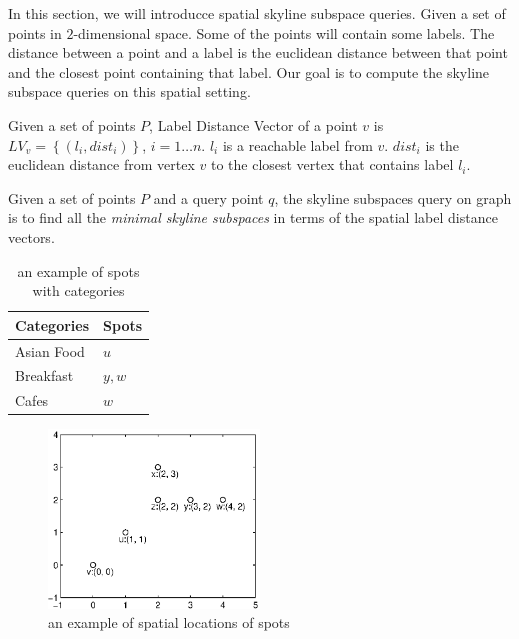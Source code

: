 In this section, we will introducce spatial skyline subspace queries. Given a set of points in $2$-dimensional space. Some of the points will contain some labels. The distance between a point and a label is the euclidean distance between that point and the closest point containing that label. Our goal is to compute the skyline subspace queries on this spatial setting.

\begin{definition}
Given a set of points $P$, Label Distance Vector of a point $v$ is $LV_v=\left\{\left(l_i, dist_i\right)\right\}$, $i = 1 \ldots n$. $l_i$ is a reachable label from $v$. $dist_i$ is the euclidean distance from vertex $v$ to the closest vertex that contains label $l_i$.
\end{definition}

\begin{definition}
Given a set of points $P$ and a query point $q$, the skyline subspaces query on graph is to find all the \emph{minimal skyline subspaces} in terms of the spatial label distance vectors.
\end{definition}

\begin{table}[h]
    \centering
    \begin{tabular}{|l|l|}
    \hline
    Categories     & Spots \\ \hline
    Asian Food     & $u$     \\ \hline
    Breakfast      & $y, w$  \\ \hline
    Cafes          & $w$     \\ \hline
    \end{tabular}
    \caption{\label{font-table} an example of spots with categories}
    \label{tab:spot_category}
\end{table}


\begin{figure}[h]
    \centering
    \includegraphics[width=0.5\textwidth]{figs/spatial_figure}
    \caption{\label{font-figure}an example of spatial locations of spots}
    \label{fig:spatial_map}
\end{figure}

